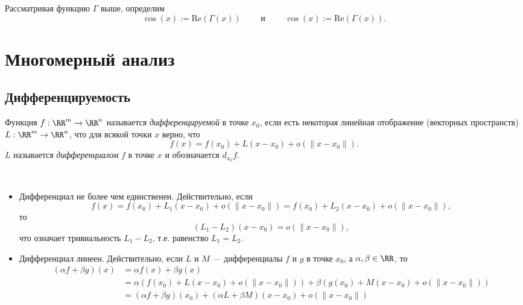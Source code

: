 \documentclass[12pt,a4paper]{article}
\renewcommand{\Re}{\mathrm{Re}}
\begin{document}
    \begin{definition}
        Рассматривая функцию $\Gamma$ выше, определим
        \[\cos(x) := \Re(\Gamma(x)) \qquad \text{ и } \qquad \cos(x) := \Re(\Gamma(x)).\]
    \end{definition}

    \section{Многомерный анализ}

    \subsection{Дифференцируемость}

    \begin{definition}
        Функция $f: \RR^m \to \RR^n$ называется \emph{дифференцируемой} в точке $x_0$, если есть некоторая линейная отображение (векторных пространств) $L: \RR^m \to \RR^n$, что для всякой точки $x$ верно, что
        \[f(x) = f(x_0) + L(x - x_0) + o(\|x-x_0\|).\]
        $L$ называется \emph{дифференциалом} $f$ в точке $x$ и обозначается $d_{x_0} f$.
    \end{definition}

    \begin{remark}\ 
        \begin{itemize}
            \item Дифференциал не более чем единственен. Действительно, если
                \[f(x) = f(x_0) + L_1(x - x_0) + o(\|x-x_0\|) = f(x_0) + L_2(x - x_0) + o(\|x-x_0\|),\]
                то
                \[(L_1-L_2)(x - x_0) = o(\|x-x_0\|),\]
                что означает тривиальность $L_1 - L_2$, т.е. равенство $L_1 = L_2$.
            \item Дифференциал линеен. Действительно, если $L$ и $M$ --- дифференциалы $f$ и $g$ в точке $x_0$, а $\alpha, \beta \in \RR$, то
                \begin{align*}
                    (\alpha f + \beta g)(x)
                    &= \alpha f(x) + \beta g(x)\\
                    &= \alpha (f(x_0) + L(x - x_0) + o(\|x-x_0\|)) + \beta (g(x_0) + M(x-x_0) + o(\|x-x_0\|))\\
                    &= (\alpha f + \beta g)(x_0) + (\alpha L + \beta M)(x - x_0) + o(\|x-x_0\|)
                \end{align*}
        \end{itemize}
    \end{remark}
\end{document}
